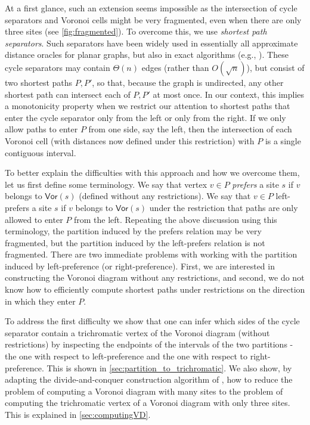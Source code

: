 \documentclass{article}
\newcommand{\Vor}{\textsf{Vor}}
\begin{document}
At a first glance, such an extension seems impossible as the intersection of cycle separators and Voronoi cells might be very fragmented, even when there are only three sites (see \cref{fig:fragmented}).
To overcome this, we use {\em shortest path separators}.
Such separators have been widely used in essentially all approximate distance oracles for planar graphs, but also in exact algorithms (e.g.,  \cite{DBLP:conf/soda/ChalermsookFN04,BorradaileSW15,DBLP:conf/esa/LackiS11,DBLP:conf/soda/MozesNNW18}). These cycle separators may contain $\Theta(n)$ edges (rather than $O(\sqrt n)$), but consist of two shortest paths $P,P'$, so that, because the graph is undirected, any other shortest path can intersect each of $P,P'$ at most once.
In our context, this implies a monotonicity property when we restrict our attention to shortest paths that enter the cycle separator only from the left or only from the right.
If we only allow paths to enter $P$ from one side, say the left, then the intersection of each Voronoi cell (with distances now defined under this restriction) with $P$ is a single contiguous interval.

To better explain the difficulties with this approach and how we overcome them,  let us first define some terminology.
We say that vertex $v\in P$ {\em prefers} a site $s$ if $v$ belongs to $\Vor(s)$ (defined without any restrictions).
We say that $v \in P$ left-prefers a site $s$ if $v$ belongs to $\Vor(s)$ under the restriction that paths are only allowed to enter $P$ from the left.
Repeating the above discussion using this terminology, the partition induced by the prefers relation may be very fragmented, but the partition induced by the left-prefers relation is not fragmented.
There are two immediate problems with working with the partition induced by left-preference (or right-preference).
First, we are interested in constructing the Voronoi diagram without any restrictions, and second, we do not know how to efficiently compute shortest paths under restrictions on the direction in which they enter $P$.

To address the first difficulty we show that one can infer which sides of the cycle separator contain a trichromatic vertex of the Voronoi diagram (without restrictions) by inspecting the endpoints of the intervals of the two partitions - the one with respect to left-preference and the one with respect to right-preference. This is shown in \cref{sec:partition_to_trichromatic}. We also show, by adapting the divide-and-conquer construction algorithm of \cite{DBLP:journals/siamcomp/GawrychowskiKMS21}, how to reduce the problem of computing a Voronoi diagram with many sites to the problem of computing the trichromatic vertex of a Voronoi diagram with only three sites. This is explained in \cref{sec:computingVD}.
\end{document}
